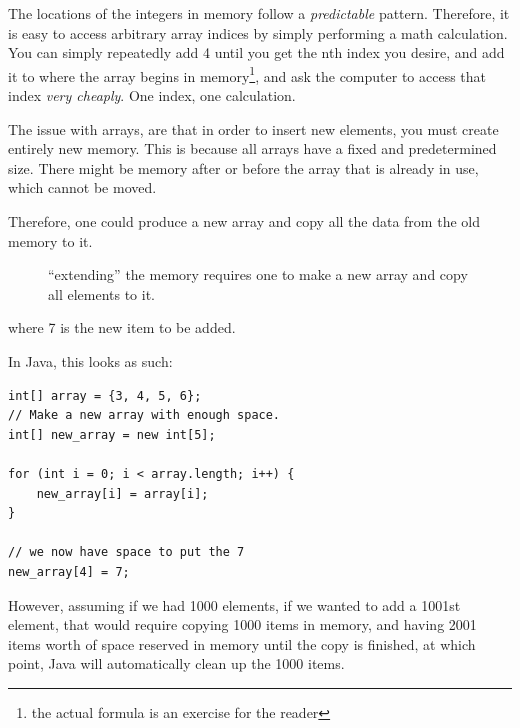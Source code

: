 \documentclass[./main.tex]{subfiles}
\begin{document}
The locations of the integers in memory follow a \emph{predictable} pattern. Therefore, it is easy to access arbitrary
array indices by simply performing a math calculation. You can simply repeatedly add 4 until you get the nth index you desire,
and add it to where the array begins in memory\footnote{the actual formula is an exercise for the reader}, and ask the computer
to access that index \emph{very cheaply}. One index, one calculation.

The issue with arrays, are that in order to insert new elements, you must create entirely new memory.
This is because all arrays have a fixed and predetermined size. There might be memory after or before the array that is already
in use, which cannot be moved.

Therefore, one could produce a new array and copy all the data from the old memory to it.

\newpage

\begin{figure}[htbp]
    \centering
    \caption{``extending'' the memory requires one to make a new array and copy all elements to it.}
    \label{fig:array-extend}
\end{figure}

where 7 is the new item to be added.

In Java, this looks as such:

\begin{verbatim}
int[] array = {3, 4, 5, 6};
// Make a new array with enough space.
int[] new_array = new int[5];

for (int i = 0; i < array.length; i++) {
    new_array[i] = array[i];
}

// we now have space to put the 7 
new_array[4] = 7;
\end{verbatim}

However, assuming if we had 1000 elements, if we wanted to add a 1001st element, that would require copying 1000 items in memory,
and having 2001 items worth of space reserved in memory until the copy is finished, at which point, Java will automatically clean
up the 1000 items.
\end{document}
